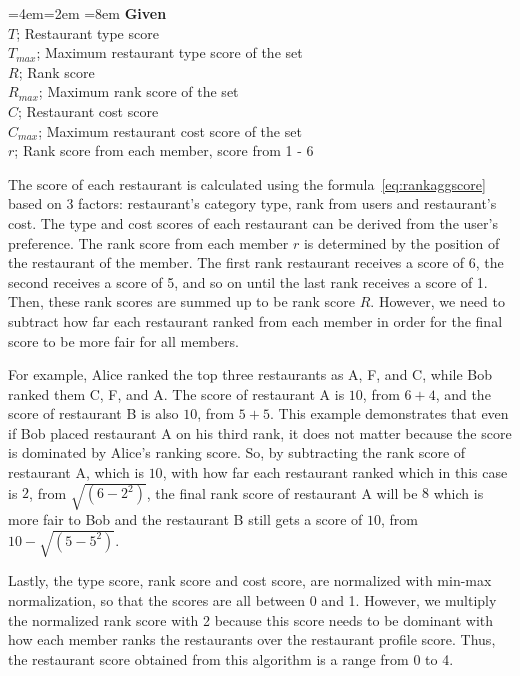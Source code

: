 \documentclass[12pt,oneside,openright,a4paper]{cpe-english-project}
\newenvironment{blockquote}{%
  \par%
  \medskip
  \leftskip=4em\rightskip=2em%
  \noindent\ignorespaces}{%
  \par\medskip}
\begin{document}
\begin{blockquote}\leftskip=8em
\textbf{Given}\\
$T$; Restaurant type score\\
$T_{max}$; Maximum restaurant type score of the set\\
$R$; Rank score\\
$R_{max}$; Maximum rank score of the set\\
$C$; Restaurant cost score\\
$C_{max}$; Maximum restaurant cost score of the set\\
$r$; Rank score from each member, score from 1 - 6
\end{blockquote}

The score of each restaurant is calculated using the formula~\ref{eq:rankaggscore} based on 3 factors: restaurant’s category type, rank from users and restaurant’s cost. The type and cost scores of each restaurant can be derived from the user’s preference. The rank score from each member $r$ is determined by the position of the restaurant of the member.  The first rank restaurant receives a score of 6, the second receives a score of 5, and so on until the last rank receives a score of 1. Then, these rank scores are summed up to be rank score $R$. However, we need to subtract how far each restaurant ranked from each member in order for the final score to be more fair for all members.

For example, Alice ranked the top three restaurants as A, F, and C, while Bob ranked them C, F, and A. The score of restaurant A is $10$, from $6 + 4$, and the score of restaurant B is also $10$, from $5 + 5$. This example demonstrates that even if Bob placed restaurant A on his third rank, it does not matter because the score is dominated by Alice's ranking score. So, by subtracting the rank score of restaurant A, which is $10$, with how far each restaurant ranked which in this case is $2$, from $\sqrt{(6-2^2)}$, the final rank score of restaurant A will be $8$ which is more fair to Bob and the restaurant B still gets a score of $10$, from $10-\sqrt{(5-5^2)}$.

Lastly, the type score, rank score and cost score, are normalized with min-max normalization, so that the scores are all between 0 and 1. However, we multiply the normalized rank score with 2 because this score needs to be dominant with how each member ranks the restaurants over the restaurant profile score. Thus, the restaurant score obtained from this algorithm is a range from 0 to 4.
\end{document}
